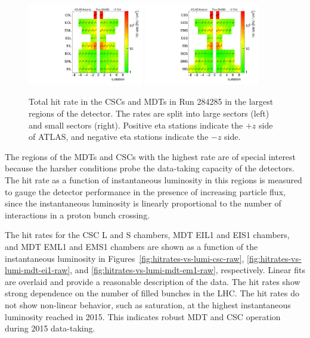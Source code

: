 \begin{figure}
  \begin{center}
    \includegraphics[width=0.45\textwidth]{./figures/rate_raw_vs_region_L_00284285.pdf}
    \includegraphics[width=0.45\textwidth]{./figures/rate_raw_vs_region_S_00284285.pdf}
    \caption{Total hit rate in the CSCs and MDTs in Run 284285 in the largest regions of the detector. The rates are split into large sectors (left) and small sectors (right). Positive eta stations indicate the $+z$ side of ATLAS, and negative eta stations indicate the $-z$ side.}
    \label{fig:hitrates-vs-region-raw}
  \end{center}
\end{figure}

The regions of the MDTs and CSCs with the highest rate are of special interest because the harsher conditions probe the data-taking capacity of the detectors. The hit rate as a function of instantaneous luminosity in this regions is measured to gauge the detector performance in the presence of increasing particle flux, since the instantaneous luminosity is linearly proportional to the number of interactions in a proton bunch crossing.

The hit rates for the CSC L and S chambers, MDT EIL1 and EIS1 chambers, and MDT EML1 and EMS1 chambers are shown as a function of the instantaneous luminosity in Figures~\ref{fig:hitrates-vs-lumi-csc-raw}, \ref{fig:hitrates-vs-lumi-mdt-ei1-raw}, and \ref{fig:hitrates-vs-lumi-mdt-em1-raw}, respectively. Linear fits are overlaid and provide a reasonable description of the data. The hit rates show strong dependence on the number of filled bunches in the LHC. The hit rates do not show non-linear behavior, such as saturation, at the highest instantaneous luminosity reached in 2015. This indicates robust MDT and CSC operation during 2015 data-taking.

